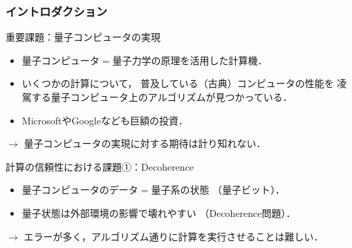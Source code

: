 \documentclass{beamer} %
\theoremstyle{example}
\begin{document}
\begin{frame}
  \frametitle{イントロダクション}
  \begin{block}{重要課題：量子コンピュータの実現}
    \begin{itemize}
      \item 量子コンピュータ\(=\)量子力学の原理を活用した計算機．
      \item いくつかの計算について，
            普及している（古典）コンピュータの性能を
            凌駕する量子コンピュータ上のアルゴリズムが見つかっている．
      \item MicrosoftやGoogleなども巨額の投資．
    \end{itemize}
    \begin{center}
      \(\longrightarrow\)
      量子コンピュータの実現に対する期待は計り知れない．
    \end{center}
  \end{block}

  \begin{block}{計算の信頼性における課題①：Decoherence}
    \begin{itemize}
      \item 量子コンピュータのデータ\(=\)量子系の状態
            （\alert{量子ビット}）．
      \item 量子状態は外部環境の影響で壊れやすい
            （\alert{Decoherence問題}）．
    \end{itemize}
    \begin{center}
      \(\longrightarrow\)
      エラーが多く，アルゴリズム通りに計算を実行させることは難しい．
    \end{center}
  \end{block}
\end{frame}
\end{document}
